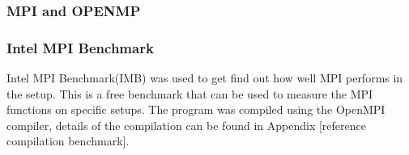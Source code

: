 \subsubsection{MPI and OPENMP}

\subsubsection{Intel MPI Benchmark}
Intel MPI Benchmark(IMB) was used to get find out how well MPI performs in the setup. This is a free benchmark that can be used to measure the MPI functions on specific setups. The program was compiled using the OpenMPI compiler, details of the compilation can be found in Appendix [reference compilation benchmark].
